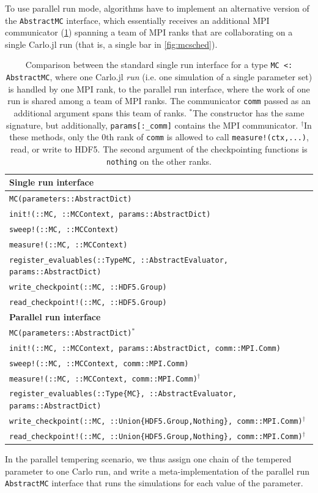 \documentclass{SciPost}
\begin{document}
To use parallel run mode, algorithms have to implement an alternative version of the \texttt{AbstractMC} interface, which essentially receives an additional MPI communicator (\cref{tab:parallelinterface}) spanning a team of MPI ranks that are collaborating on a single Carlo.jl run (that is, a single bar in \cref{fig:mcsched}).
\begin{table}
\begin{tabular}{l}
\hline
\textbf{Single run interface}\\
\hline
\texttt{MC(parameters::AbstractDict)}  \\
\texttt{init!(::MC, ::MCContext, params::AbstractDict)}\\
\texttt{sweep!(::MC, ::MCContext)}\\
\texttt{measure!(::MC, ::MCContext)}\\
\texttt{register\_{}evaluables(::Type{MC}, ::AbstractEvaluator, params::AbstractDict)}\\
\texttt{write\_{}checkpoint(::MC, ::HDF5.Group)}\\
\texttt{read\_{}checkpoint!(::MC, ::HDF5.Group)}\bigskip\\
\hline
\textbf{Parallel run interface}\\
\hline
\texttt{MC(parameters::AbstractDict)}$^*$\\
\texttt{init!(::MC, ::MCContext, params::AbstractDict, comm::MPI.Comm)}\\
\texttt{sweep!(::MC, ::MCContext, comm::MPI.Comm)}\\
\texttt{measure!(::MC, ::MCContext, comm::MPI.Comm)}$^{\dag}$\\
\texttt{register\_{}evaluables(::Type\{MC\}, ::AbstractEvaluator, params::AbstractDict)}\\
\texttt{write\_{}checkpoint(::MC, ::Union\{HDF5.Group,Nothing\}, comm::MPI.Comm)}$^\dag$\\
\texttt{read\_{}checkpoint!(::MC, ::Union\{HDF5.Group,Nothing\}, comm::MPI.Comm)}$^\dag$\\
\end{tabular}
\caption{Comparison between the standard single run interface for a type \texttt{MC <: AbstractMC}, where one Carlo.jl \textit{run} (i.e. one simulation of a single parameter set) is handled by one MPI rank, to the parallel run interface, where the work of one run is shared among a team of MPI ranks. The communicator \texttt{comm} passed as an additional argument spans this team of ranks. $^*$The constructor has the same signature, but additionally, \texttt{params[:\_{}comm]} contains the MPI communicator. $^\dag$In these methods, only the 0th rank of \texttt{comm} is allowed to call \texttt{measure!(ctx,...)}, read, or write to HDF5. The second argument of the checkpointing functions is \texttt{nothing} on the other ranks.}
\label{tab:parallelinterface}
\end{table}
In the parallel tempering scenario, we thus assign one chain of the tempered parameter to one Carlo run, and write a meta-implementation of the parallel run \texttt{AbstractMC} interface that runs the simulations for each value of the parameter.
\end{document}
